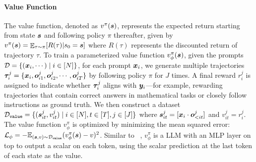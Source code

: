 \paragraph{Value Function} The value function, denoted as $v^\pi({\bm{s}})$, represents the expected return starting from state ${\bm{s}}$ and following policy $\pi$ thereafter, given by $v^\pi({\bm{s}}) = \mathop{\mathbb{E}}_{\tau \sim \pi}[R(\tau)|s_0 = {\bm{s}}]$ where $R(\tau)$ represents the discounted return of trajectory $\tau$. To train a parameterized value function $v^\pi_\phi({\bm{s}})$, given the prompts ${\mathcal{D}} = \{({\bm{x}}_i, \cdots) \mid i \in [N]\}$, for each prompt ${\bm{x}}_i$, we generate multiple trajectories ${\bm{\tau}}_i^j = \{{\bm{x}}_i, {\bm{o}}_{i1}^j, {\bm{o}}_{i2}^j, \cdots, {\bm{o}}_{iT}^j \}$ by following policy $\pi$ for $J$ times. A final reward $r_i^j$ is assigned to indicate whether ${\bm{\tau}}_i^j$ aligns with ${\bm{y}}_i$—for example, rewarding trajectories that contain correct answers in mathematical tasks or closely follow instructions as ground truth. We then construct a dataset ${\mathcal{D}}_{\mathtt{value}} = \{ ({\bm{s}}^j_{it}, v^j_{it}) \mid i \in [N], t \in [T], j \in [J] \}$ where ${\bm{s}}^j_{it} = [{\bm{x}}_i \cdot {\bm{o}}^j_{<it}]$ and $v^j_{it} = r^j_i$. The value function $v_\phi^\pi$ is optimized by minimizing the mean squared error: ${\mathcal{L}}_\phi = - {\mathbb{E}}_{({\bm{s}}, v) \sim {\mathcal{D}}_{\mathtt{value}}} (v_\phi^\pi({\bm{s}}) - v)^2$. Similar to ~\citep{feng2023alphazero}, $v_\phi^\pi$ is a LLM with an MLP layer on top to output a scalar on each token, using the scalar prediction at the last token of each state as the value.


